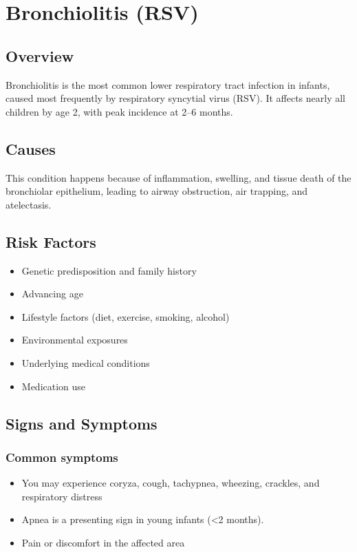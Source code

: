 \chapter{Bronchiolitis (RSV)}
\label{sec:Bronchiolitis}

\section{Overview}
Bronchiolitis is the most common lower respiratory tract infection in infants, caused most frequently by respiratory syncytial virus (RSV). It affects nearly all children by age 2, with peak incidence at 2--6 months.
\section{Causes}
This condition happens because of inflammation, swelling, and tissue death of the bronchiolar epithelium, leading to airway obstruction, air trapping, and atelectasis.     
\section{Risk Factors}

\begin{itemize}[noitemsep]
  \item Genetic predisposition and family history
  \item Advancing age
  \item Lifestyle factors (diet, exercise, smoking, alcohol)
  \item Environmental exposures
  \item Underlying medical conditions
  \item Medication use
\end{itemize}
\section{Signs and Symptoms}

\subsection{Common symptoms}
\begin{itemize}[noitemsep]
  \item You may experience coryza, cough, tachypnea, wheezing, crackles, and respiratory distress
  \item Apnea is a presenting sign in young infants (<2 months).
  \item Pain or discomfort in the affected area
  \end{itemize}

